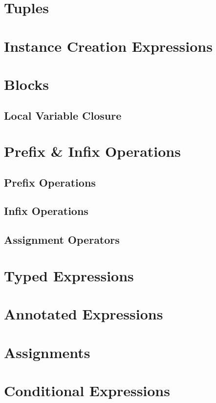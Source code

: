 \section{Tuples}

\section{Instance Creation Expressions}

\section{Blocks}

\subsection{Local Variable Closure}
\label{sec:local-variable-closure}

\section{Prefix \& Infix Operations}

\subsection{Prefix Operations}

\subsection{Infix Operations}

\subsection{Assignment Operators}

\section{Typed Expressions}

\section{Annotated Expressions}
\label{sec:annotated-exprs}

\section{Assignments}

\section{Conditional Expressions}

